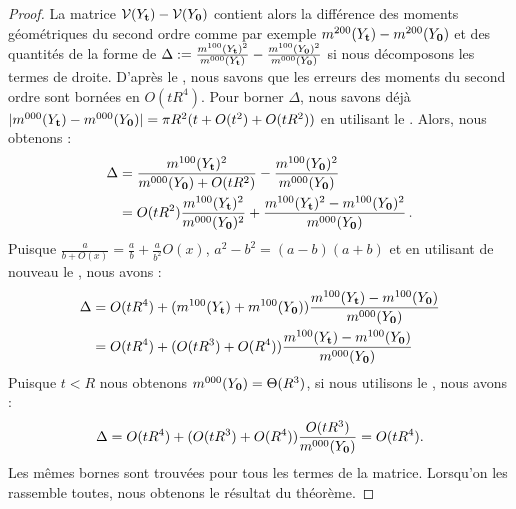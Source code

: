\begin{proof}
  La matrice $\mathcal{V}( Y_{\mathbf{t}} ) - \mathcal{V}(Y_{\mathbf{0}})$ contient alors la
  différence des moments géométriques du second ordre comme par exemple $
  m^{200}(Y_{\mathbf{t}}) - m^{200}(Y_{\mathbf{0}})$ et des quantités de la forme
  de $\Delta := \frac{m^{100}(Y_{\mathbf{t}})^2}{m^{000}(Y_{\mathbf{t}})} -
  \frac{m^{100}(Y_{\mathbf{0}})^2}{m^{000}(Y_{\mathbf{0}})}$ si nous
  décomposons les termes de droite. D'après le
  , nous savons que les erreurs des
  moments du second ordre sont bornées en $O(t R^4)$. Pour borner $\Delta$, nous
  savons déjà $|m^{000}(Y_{\mathbf{t}}) - m^{000}(Y_{\mathbf{0}})| = \pi
  R^2(t+O(t^2)+O(tR^2))$ en utilisant le .
  Alors, nous obtenons :
  \begin{align}
    \Delta &= \frac{m^{100}(Y_{\mathbf{t}})^2}{m^{000}(Y_{\mathbf{0}}) + O(tR^2)} -
    \frac{m^{100}(Y_{\mathbf{0}})^2}{m^{000}(Y_{\mathbf{0}})}\\
    &= O(tR^2)\frac{m^{100}(Y_{\mathbf{t}})^2}{m^{000}(Y_{\mathbf{0}})^2} +
    \frac{m^{100}(Y_{\mathbf{t}})^2 - m^{100}(Y_{\mathbf{0}})^2}{m^{000}(Y_{\mathbf{0}})}\,.
  \end{align}
  Puisque $\frac{a}{b+O(x)}=\frac{a}{b}+\frac{a}{b^2}O(x)$, $a^2-b^2=(a-b)(a+b)$
  et en utilisant de nouveau le , nous
  avons :
  \begin{align*}
    \Delta
    &= O(tR^4) + (m^{100}(Y_{\mathbf{t}}) + m^{100}(Y_{\mathbf{0}}))\frac{m^{100}(Y_{\mathbf{t}}) - m^{100}(Y_{\mathbf{0}})}{m^{000}(Y_{\mathbf{0}})} \\
    &= O(tR^4) + (O(tR^3)+O(R^4))\frac{m^{100}(Y_{\mathbf{t}}) - m^{100}(Y_{\mathbf{0}})}{m^{000}(Y_{\mathbf{0}})}
  \end{align*}
  Puisque $t < R$ nous obtenons $m^{000}(Y_{\mathbf{0}}) = \Theta(R^3)$, si nous
  utilisons le , nous avons :
  \begin{equation}
    \Delta = O(tR^4) + (O(tR^3)+O(R^4))\frac{O(tR^3)}{m^{000}(Y_{\mathbf{0}})} = O(tR^4).
  \end{equation}
  Les mêmes bornes sont trouvées pour tous les termes de la matrice. Lorsqu'on
  les rassemble toutes, nous obtenons le résultat du théorème.
  \end{proof}

